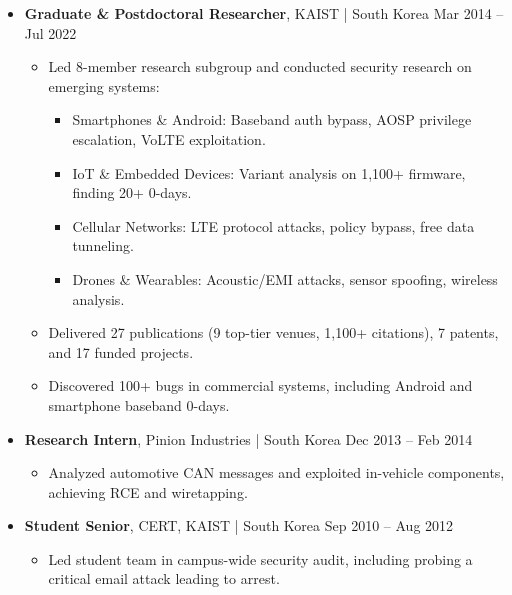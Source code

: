 \documentclass[11pt,letterpaper]{article}
\newcommand{\jobtitle}[1]{\textbf{#1}}
\newcommand{\location}[1]{\textcolor{secondary}{\small #1}}
\newcommand{\daterange}[1]{\textcolor{secondary}{\small #1}}
\begin{document}
\begin{itemize}
\item \jobtitle{Graduate \& Postdoctoral Researcher}, \location{KAIST | South Korea} \hfill \daterange{Mar 2014 -- Jul 2022}
    \begin{itemize}[] %
    \item Led 8-member research subgroup and conducted security research on emerging systems:
        \begin{itemize}[]
        \item Smartphones \& Android: Baseband auth bypass, AOSP privilege escalation, VoLTE exploitation.
        \item IoT \& Embedded Devices: Variant analysis on 1,100+ firmware, finding 20+ 0-days.
        \item Cellular Networks: LTE protocol attacks, policy bypass, free data tunneling.
        \item Drones \& Wearables: Acoustic/EMI attacks, sensor spoofing, wireless analysis.
        \end{itemize}
    \item Delivered 27 publications (9 top-tier venues, 1,100+ citations), 7 patents, and 17 funded projects.
    \item Discovered 100+ bugs in commercial systems, including Android and smartphone baseband 0-days.
    \end{itemize}

\item \jobtitle{Research Intern}, \location{Pinion Industries | South Korea} \hfill \daterange{Dec 2013 -- Feb 2014}
    \begin{itemize}[] %
    \item Analyzed automotive CAN messages and exploited in-vehicle components, achieving RCE and wiretapping.
    \end{itemize}

\item \jobtitle{Student Senior}, \location{CERT, KAIST | South Korea} \hfill \daterange{Sep 2010 -- Aug 2012}
    \begin{itemize}[] %
    \item Led student team in campus-wide security audit, including probing a critical email attack leading to arrest.
    \end{itemize}
\end{itemize}

\end{document}
